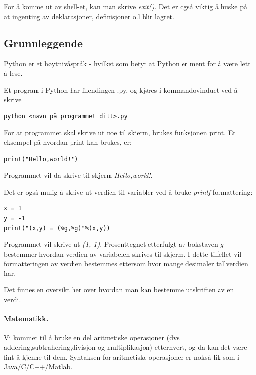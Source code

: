 \documentclass[%
oneside,                 %
final,                   %
10pt]{article}
\begin{document}
For å komme ut av shell-et, kan man skrive \emph{exit()}. Det er også viktig å huske på at ingenting av deklarasjoner, definisjoner o.l blir lagret.

\subsection{Grunnleggende}
Python er et høytnivåspråk - hvilket som betyr at Python er ment for å være lett å lese.

Et program i Python har filendingen .py, og kjøres i kommandovinduet ved å skrive
\begin{verbatim}
python <navn på programmet ditt>.py
\end{verbatim}

For at programmet skal skrive ut noe til skjerm, brukes funksjonen print.
Et eksempel på hvordan print kan brukes, er:

\begin{verbatim}
print("Hello,world!")
\end{verbatim}

Programmet vil da skrive til skjerm \emph{Hello,world!}.

Det er også mulig å skrive ut verdien til variabler ved å bruke \emph{printf}-formattering:

\begin{verbatim}
x = 1
y = -1
print("(x,y) = (%g,%g)"%(x,y))
\end{verbatim}

Programmet vil skrive ut \emph{(1,-1)}. Prosenttegnet etterfulgt av bokstaven \emph{g} bestemmer hvordan verdien av variabelen skrives til skjerm.
I dette tilfellet vil formatteringen av verdien bestemmes ettersom hvor mange desimaler tallverdien har.

Det finnes en oversikt \href{{https://docs.python.org/2/library/stdtypes.html#string-formatting}}{her} over hvordan man kan bestemme utskriften av en verdi.


\paragraph{Matematikk.}
Vi kommer til å bruke en del aritmetiske operasjoner (dvs addering,subtrahering,divisjon og multiplikasjon) etterhvert, og da kan det være fint å kjenne til dem.
Syntaksen for aritmetiske operasjoner er nokså lik som i Java/C/C++/Matlab.
\end{document}
